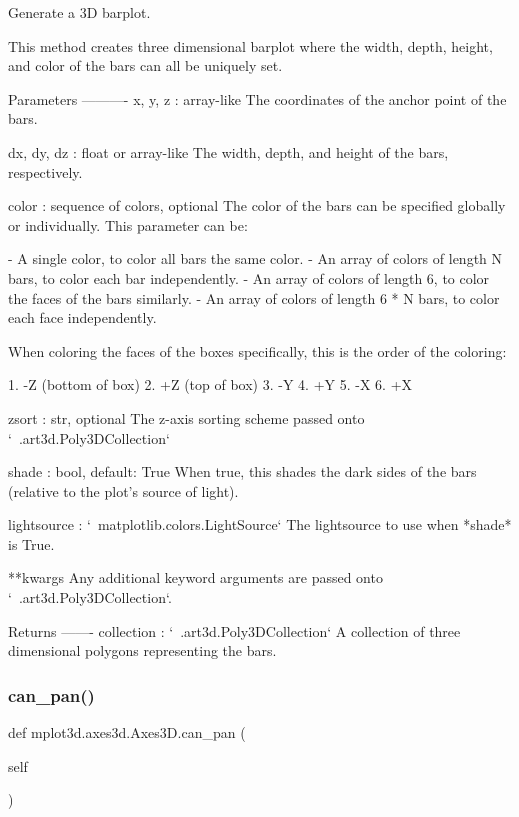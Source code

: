 \begin{DoxyVerb}Generate a 3D barplot.

This method creates three dimensional barplot where the width,
depth, height, and color of the bars can all be uniquely set.

Parameters
----------
x, y, z : array-like
    The coordinates of the anchor point of the bars.

dx, dy, dz : float or array-like
    The width, depth, and height of the bars, respectively.

color : sequence of colors, optional
    The color of the bars can be specified globally or
    individually. This parameter can be:

    - A single color, to color all bars the same color.
    - An array of colors of length N bars, to color each bar
      independently.
    - An array of colors of length 6, to color the faces of the
      bars similarly.
    - An array of colors of length 6 * N bars, to color each face
      independently.

    When coloring the faces of the boxes specifically, this is
    the order of the coloring:

    1. -Z (bottom of box)
    2. +Z (top of box)
    3. -Y
    4. +Y
    5. -X
    6. +X

zsort : str, optional
    The z-axis sorting scheme passed onto `~.art3d.Poly3DCollection`

shade : bool, default: True
    When true, this shades the dark sides of the bars (relative
    to the plot's source of light).

lightsource : `~matplotlib.colors.LightSource`
    The lightsource to use when *shade* is True.

**kwargs
    Any additional keyword arguments are passed onto
    `~.art3d.Poly3DCollection`.

Returns
-------
collection : `~.art3d.Poly3DCollection`
    A collection of three dimensional polygons representing
    the bars.
\end{DoxyVerb}
 \mbox{\label{classmplot3d_1_1axes3d_1_1Axes3D_afd731a88dde18af49d60297a7c391ce5}} 
\subsubsection{\texorpdfstring{can\+\_\+pan()}{can\_pan()}}
{\footnotesize\ttfamily def mplot3d.\+axes3d.\+Axes3\+D.\+can\+\_\+pan (\begin{DoxyParamCaption}\item[{}]{self }\end{DoxyParamCaption})}

